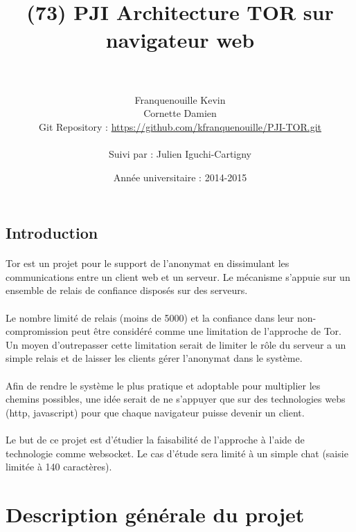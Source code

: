\documentclass[a4paper,12pt]{report}
\title{	
		\horrule{0.5pt} \\[0.5cm]
		\huge(73) PJI Architecture TOR sur\\ navigateur web \\
		\horrule{0.5pt} \\[0.5cm]
}
\author{
		\normalfont 								\normalsize
        Franquenouille Kevin\\[-3pt]		\normalsize
       	Cornette Damien\\[-3pt]		\normalsize
       	Git Repository : \url{https://github.com/kfranquenouille/PJI-TOR.git} \\[-3pt]		\normalsize
       	\\
       	\normalfont
       	Suivi par : Julien Iguchi-Cartigny\\[-3pt]		\normalsize
}
\date{
		\normalfont 								\normalsize
        Année universitaire : 2014-2015\\[-3pt]		\normalsize
}
\begin{document}
\maketitle	

\newpage
\begin{center}
\section*{Introduction}
\end{center}
\paragraph{}
Tor est un projet pour le support de l'anonymat en dissimulant les communications entre un client web et un serveur. Le mécanisme s'appuie sur un ensemble de relais de confiance disposés sur des serveurs. 
\paragraph{} 
Le nombre limité de relais (moins de 5000) et la confiance dans leur non-compromission peut être considéré comme une limitation de l'approche de Tor. Un moyen d'outrepasser cette limitation serait de limiter le rôle du serveur a un simple relais et de laisser les clients gérer l'anonymat dans le système. 
\paragraph{}
Afin de rendre le système le plus pratique et adoptable pour multiplier les chemins possibles, une idée serait de ne s'appuyer que sur des technologies webs (http, javascript) pour que chaque navigateur puisse devenir un client.
\paragraph{}
Le but de ce projet est d'étudier la faisabilité de l'approche à l'aide de technologie comme websocket. Le cas d'étude sera limité à un simple chat (saisie limitée à 140 caractères).


\tableofcontents

\newpage
\section{Description générale du projet}
\end{document}
